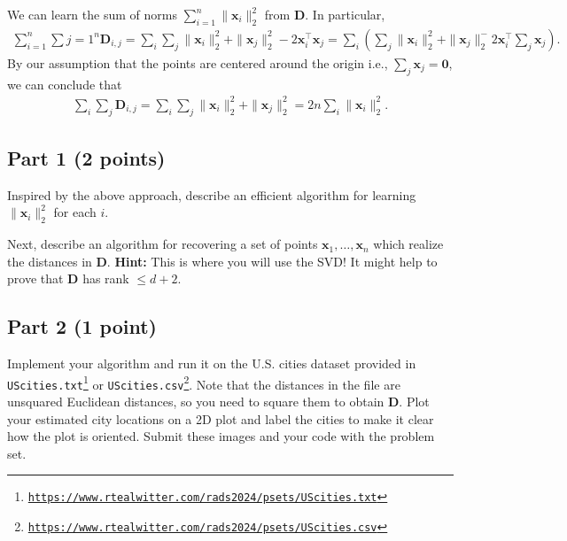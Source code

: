 \documentclass{article}
\begin{document}
We can learn the sum of norms $\sum_{i=1}^n \| \mathbf{x}_i\|_2^2$ from $\mathbf{D}$.
In particular,
\begin{align*}
\sum_{i=1}^n \sum{j=1}^n \mathbf{D}_{i,j} = \sum_{i}\sum_{j}
\| \mathbf{x}_i \|_2^2  + \| \mathbf{x}_j \|_2^2 - 2 \mathbf{x}_i^\top \mathbf{x}_j =
\sum_{i} \left(\sum_{j} \| \mathbf{x}_i \|_2^2  + \| \mathbf{x}_j \|_2^
- 2 \mathbf{x}_i^\top \sum_{j} \mathbf{x}_j \right).
\end{align*}
By our assumption that the points are centered around the origin i.e., $\sum_j \mathbf{x}_j = \mathbf{0}$, we can conclude that
\begin{align*}
\sum_{i}\sum_{j} \mathbf{D}_{i,j} = \sum_i \sum_j \| \mathbf{x}_i \|_2^2 + \| \mathbf{x}_j \|_2^2 = 2n \sum_i \| \mathbf{x}_i \|_2^2.
\end{align*}

\subsection*{Part 1 (2 points)}
Inspired by the above approach, describe an efficient algorithm for learning $\| \mathbf{x}_i \|_2^2$ for each $i$.

Next, describe an algorithm for recovering a set of points $\mathbf{x}_1,\ldots, \mathbf{x}_n$ which realize the distances in $\mathbf{D}$.
\textbf{Hint:} This is where you will use the SVD! It might help to prove that $\mathbf{D}$ has rank $\leq d + 2$.

\subsection*{Part 2 (1 point)}
Implement your algorithm and run it on the U.S. cities dataset provided in 
\texttt{UScities.txt}\footnote{\texttt{\url{https://www.rtealwitter.com/rads2024/psets/UScities.txt}}}
or 
\texttt{UScities.csv}\footnote{\texttt{\url{https://www.rtealwitter.com/rads2024/psets/UScities.csv}}}.
Note that the distances in the file are unsquared Euclidean distances, so you need to square them to obtain $\mathbf{D}$. Plot your  estimated city locations on a 2D plot and label the cities to make it clear how the plot is oriented. Submit these images and your code with the problem set.

%
\end{document}
